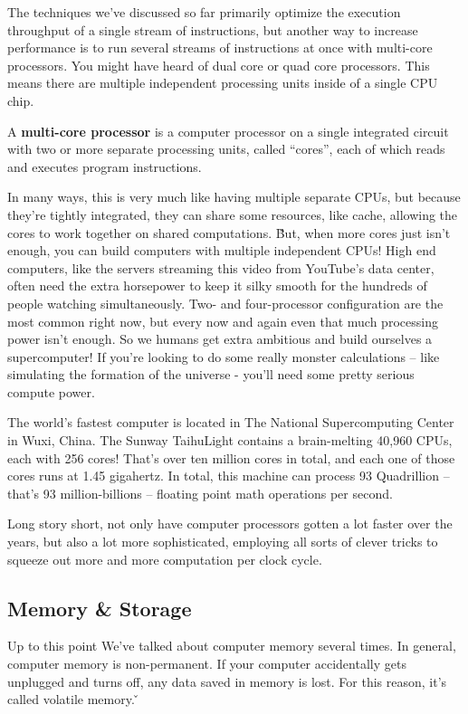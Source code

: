 The techniques we've discussed so far primarily optimize the execution throughput of a single stream of instructions,
but another way to increase performance is to run several streams of instructions at once with multi-core processors.
You might have heard of dual core or quad core processors. This means there are multiple independent processing units
inside of a single CPU chip.

A \textbf{multi-core processor} is a computer processor on a single integrated circuit with two or more separate
processing units, called ``cores'', each of which reads and executes program instructions.
\ed

In many ways, this is very much like having multiple separate CPUs, but because they're tightly integrated, they can
share some resources, like cache, allowing the cores to work together on shared computations. \v

But, when more cores just isn't enough, you can build computers with multiple independent CPUs! High end computers,
like the servers streaming this video from YouTube's data center, often need the extra horsepower to keep it silky
smooth for the hundreds of people watching simultaneously. Two- and four-processor configuration are the most common
right now, but every now and again even that much processing power isn't enough. So we humans get extra ambitious and
build ourselves a supercomputer! If you're looking to do some really monster calculations – like simulating the
formation of the universe - you'll need some pretty serious compute power.

\be
The world's fastest computer is located in The National Supercomputing Center in Wuxi, China. The Sunway TaihuLight
contains a brain-melting 40,960 CPUs, each with 256 cores! That's over ten million cores in total, and each one of
those cores runs at 1.45 gigahertz. In total, this machine can process 93 Quadrillion -- that's 93 million-billions
-- floating point math operations per second.
\ee

Long story short, not only have computer processors gotten a lot faster over the years, but also a lot more
sophisticated, employing all sorts of clever tricks to squeeze out more and more computation per clock cycle.

\subsection{Memory \& Storage}

Up to this point We've talked about computer memory several times. In general, computer memory is non-permanent. If
your computer accidentally gets unplugged and turns off, any data saved in memory is lost. For this reason, it's
called volatile memory. \v

